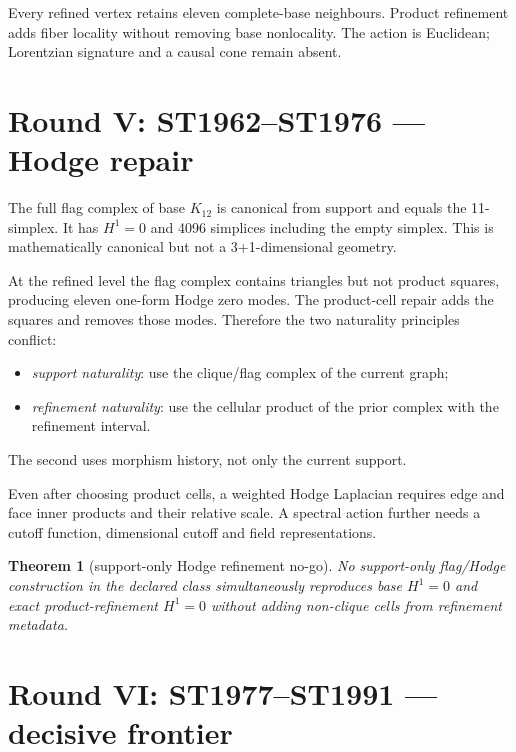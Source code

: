 \documentclass[11pt,a4paper]{article}
\newtheorem{theorem}{Theorem}\newcommand{\status}[1]{\textsf{[#1]}}
\begin{document}
Every refined vertex retains eleven complete-base neighbours.  Product
refinement adds fiber locality without removing base nonlocality.  The action
is Euclidean; Lorentzian signature and a causal cone remain absent.

\section{Round V: ST1962--ST1976 --- Hodge repair}

The full flag complex of base $K_{12}$ is canonical from support and equals the
11-simplex.  It has $H^1=0$ and 4096 simplices including the empty simplex.
This is mathematically canonical but not a 3+1-dimensional geometry.

At the refined level the flag complex contains triangles but not product
squares, producing eleven one-form Hodge zero modes.  The product-cell repair
adds the squares and removes those modes.  Therefore the two naturality
principles conflict:
\begin{itemize}
\item \emph{support naturality}: use the clique/flag complex of the current
      graph;
\item \emph{refinement naturality}: use the cellular product of the prior
      complex with the refinement interval.
\end{itemize}
The second uses morphism history, not only the current support.

Even after choosing product cells, a weighted Hodge Laplacian requires edge and
face inner products and their relative scale.  A spectral action further needs
a cutoff function, dimensional cutoff and field representations.

\begin{theorem}[support-only Hodge refinement no-go]
No support-only flag/Hodge construction in the declared class simultaneously
reproduces base $H^1=0$ and exact product-refinement $H^1=0$ without adding
non-clique cells from refinement metadata.
\end{theorem}

\section{Round VI: ST1977--ST1991 --- decisive frontier}
\end{document}
